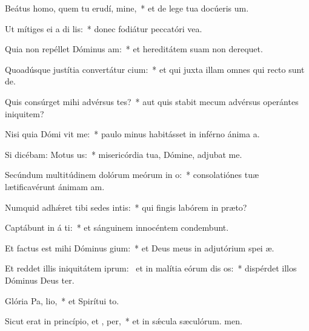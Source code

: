 \item Beátus homo, quem tu erudí, mine,~* et de lege tua docúeris um.
\item Ut mítiges ei a di lis:~* donec fodiátur peccatóri vea.
\item Quia non repéllet Dóminus  am:~* et hereditátem suam non derequet.
\item Quoadúsque justítia convertátur  cium:~* et qui juxta illam omnes qui recto sunt de.
\item Quis consúrget mihi advérsus tes?~* aut quis stabit mecum advérsus operántes iniquitem?
\item Nisi quia Dómi vit me:~* paulo minus habitásset in inférno ánima a.
\item Si dicébam: Motus   us:~* misericórdia tua, Dómine, adjubat me.
\item Secúndum multitúdinem dolórum meórum in  o:~* consolatiónes tuæ lætificavérunt ánimam am.
\item Numquid adhǽret tibi sedes intis:~* qui fingis labórem in præto?
\item Captábunt in á ti:~* et sánguinem innocéntem condembunt.
\item Et factus est mihi Dóminus  gium:~* et Deus meus in adjutórium spei æ.
\item Et reddet illis iniquitátem iprum:~\pscross{} et in malítia eórum dis os:~* dispérdet illos Dóminus Deus ter.
\item Glória Pa,  lio,~* et Spirítui to.
\item Sicut erat in princípio, et ,  per,~* et in sǽcula sæculórum. men.
